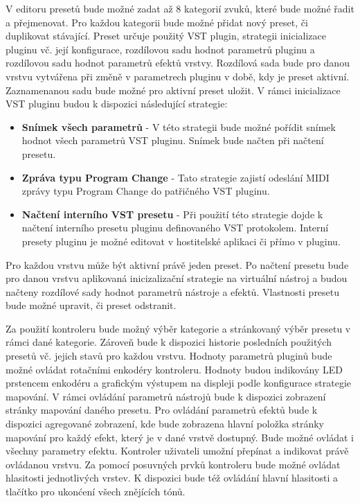 \documentclass[thesis=M,czech]{FITthesis}[2019/03/06]
\begin{document}
		V editoru presetů bude možné zadat až 8 kategorií zvuků, které bude možné řadit a přejmenovat.
		Pro každou kategorii bude možné přidat nový preset, či duplikovat stávající. Preset určuje použitý VST plugin,
		strategii inicializace pluginu vč. její konfigurace, rozdílovou sadu hodnot parametrů pluginu a rozdílovou sadu hodnot parametrů efektů vrstvy.
		Rozdílová sada bude pro danou vrstvu vytvářena při změně v parametrech pluginu v době, kdy je preset aktivní. Zaznamenanou sadu bude možné pro aktivní preset uložit.
		V rámci inicializace VST pluginu budou k dispozici následující strategie:
		\begin{itemize}
			\item \textbf{Snímek všech parametrů} - V této strategii bude možné pořídit snímek hodnot všech parametrů VST pluginu. Snímek bude načten při načtení presetu.
			\item \textbf{Zpráva typu Program Change} - Tato strategie zajistí odeslání MIDI zprávy typu Program Change do patřičného VST pluginu.
			\item \textbf{Načtení interního VST presetu} - Při použití této strategie dojde k načtení interního presetu pluginu definovaného VST protokolem. Interní presety pluginu je možné editovat v hostitelské aplikaci či přímo v pluginu.
		\end{itemize}
		Pro každou vrstvu může být aktivní právě jeden preset. Po načtení presetu bude 
		pro danou vrstvu aplikovaná inicizalizační strategie na virtuální nástroj a budou načteny rozdílové sady hodnot parametrů nástroje a efektů.
		Vlastnosti presetu bude možné upravit, či preset odstranit.
	
		Za použití kontroleru bude možný výběr kategorie a stránkovaný výběr presetu v rámci dané kategorie. Zároveň bude k dispozici
		historie posledních použitých presetů vč. jejich stavů pro každou vrstvu.
		Hodnoty parametrů pluginů bude možné ovládat rotačními enkodéry kontroleru. Hodnoty budou indikovány LED prstencem enkodéru a grafickým výstupem na displeji podle konfigurace strategie mapování.
		V rámci ovládání parametrů nástrojů bude k dispozici
		zobrazení stránky mapování daného presetu. Pro ovládání parametrů efektů bude k dispozici agregované zobrazení, kde bude zobrazena
		hlavní položka stránky mapování pro každý efekt, který je v dané vrstvě dostupný. Bude možné ovládat i všechny parametry efektu.
		Kontroler uživateli umožní přepínat a indikovat právě ovládanou vrstvu. 
		Za pomocí posuvných prvků kontroleru bude možné ovládat hlasitosti jednotlivých vrstev.
		K dispozici bude též ovládání hlavní hlasitosti a tlačítko pro ukonćení všech znějících tónů.
	
\end{document}
